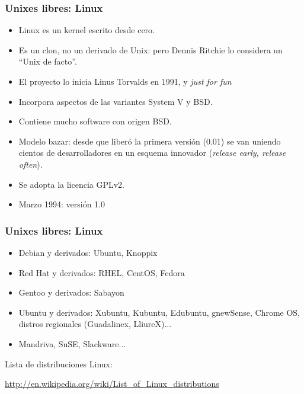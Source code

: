 \documentclass{beamer}
\begin{document}
\begin{frame}
\frametitle{Unixes libres: Linux}

\begin{itemize}
\item Linux es un kernel escrito desde cero. 
\item Es un clon, no un derivado de Unix: pero Dennis Ritchie lo considera un ``Unix de facto''.
\item El proyecto lo inicia Linus Torvalds en 1991, y \textit{just for fun}
\item Incorpora aspectos de las variantes System V y BSD. 
\item Contiene mucho software con origen BSD.
\item Modelo bazar: desde que liberó la primera versión (0.01) se van uniendo cientos de desarrolladores en un esquema innovador (\textit{release early, release often}).
\item Se adopta la licencia GPLv2.
\item Marzo 1994: versión 1.0
\end{itemize}

\end{frame}



\begin{frame}
\frametitle{Unixes libres: Linux}

\begin{itemize}

\item Debian y derivados: Ubuntu, Knoppix
\item Red Hat y derivados: RHEL, CentOS, Fedora
\item Gentoo y derivados: Sabayon
\item Ubuntu y derivados: Xubuntu, Kubuntu, Edubuntu, gnewSense, Chrome OS, distros regionales (Guadalinex, LliureX)...
\item Mandriva, SuSE, Slackware...

\end{itemize}

\pause

\begin{center}
Lista de distribuciones Linux: 
\begin{small}
\url{http://en.wikipedia.org/wiki/List_of_Linux_distributions}
\end{small}
\end{center}


\end{frame}
\end{document}

